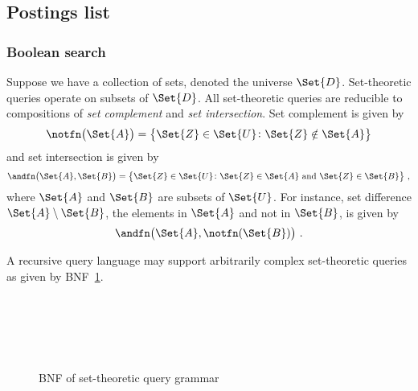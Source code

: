 \documentclass[ ../main.tex]{subfiles}
\begin{document}
\subsection{Postings list}
\subsubsection{Boolean search}
Suppose we have a collection of sets, denoted the universe $\Set{D}$. Set-theoretic queries operate on subsets of $\Set{D}$. All set-theoretic queries are reducible to compositions of \emph{set complement} and \emph{set intersection}. Set complement is given by
\begin{equation}
    \notfn\!\left(\Set{A}\right) = \left\{\Set{Z} \in \Set{U} \colon \Set{Z} \notin \Set{A}\right\}
\end{equation}
and set intersection is given by
\begin{equation}
    \andfn\!\left(\Set{A}, \Set{B}\right) = \left\{\Set{Z} \in \Set{U} \colon \text{$\Set{Z} \in \Set{A}$ and $\Set{Z} \in \Set{B}$}\right\}\,,
\end{equation}
where $\Set{A}$ and $\Set{B}$ are subsets of $\Set{U}$. For instance, set difference $\Set{A} \setminus \Set{B}$, the elements in $\Set{A}$ and not in $\Set{B}$, is given by
\begin{equation}
    \andfn\!\left(\Set{A}, \notfn(\Set{B})\right)\,.
\end{equation}

A recursive query language may support arbitrarily complex set-theoretic queries as given by BNF~\ref{bnf:set_theoretic}.
\begin{figure}
\caption{BNF of set-theoretic query grammar}
\label{bnf:set_theoretic}
\begin{bnf*}
         \bnfor {} \bnfor {}\\
      \bnfts{(}\bnfts{)}\\
         \bnfts{(}\bnfts{,}\bnfts{)}\\
     \bnfts{$\notfn$} \bnfor \bnfsk\\
     \bnfts{$\andfn$} \bnfor \bnfts{$\orfn$} \bnfor \bnfts{$\diffn$} \bnfor \bnfsk
\end{bnf*}
\end{figure}
\end{document}
